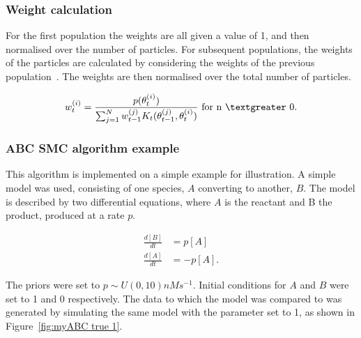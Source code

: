 \subsubsection{Weight calculation}
\label{sec:weight}
For the first population the weights are all given a value of 1, and then normalised over the number of particles. For subsequent populations, the weights of the particles are calculated by considering the weights of the previous population~\autocite{Toni:2009tr}. The weights are then normalised over the total number of particles. 


\begin{align}
w_{t}^{(i)} = \frac{p(\theta_{t}^{(i)})}{\sum_{j=1}^N w_{t-1}^{(j)} K_{t}(\theta_{t-1}^{(j)}, \theta_{t}^{(i)})} \text{ for n $\textgreater$  0}.
\end{align}
	
	
\subsubsection{ABC SMC algorithm example}	
This algorithm is implemented on a simple example for illustration. A simple model was used, consisting of one species, $A$ converting to another, $B$. The model is described by two differential equations, where $A$ is the reactant and B the product, produced at a rate $p$. 

\begin{align}
\frac{d[B]}{dt} &= p[A] \\ 
\frac{d[A]}{dt} &= -p[A]. 
\end{align}

\noindent The priors were set to $p \sim U(0, 10)nM s^{-1}$. Initial conditions for $A$ and $B$ were set to 1 and 0 respectively. The data to which the model was compared to was generated by simulating the same model with the parameter set to 1, as shown in Figure~\ref{fig:myABC true 1}.


